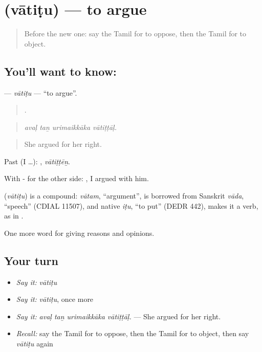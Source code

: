 \section[\texorpdfstring{\ta{வாதிடு} (vātiṭu)}{வாதிடு (vātiṭu)}]{ (vātiṭu) — to argue}

\label{lesson:TA-C348-vatitu}



\begin{quote}
Before the new one: say the Tamil for to oppose, then the Tamil for to object.
\end{quote}

\subsection*{You'll want to know: }
\textbf{} — \emph{vātiṭu} — \textquotedblleft{}to argue\textquotedblright{}.

\begin{quote}
   .
\end{quote}

\begin{quote}
\emph{avaḷ taṉ urimaikkāka vātiṭṭāḷ.}
\end{quote}

\begin{quote}
She argued for her right.
\end{quote}

Past (I …): , \emph{vātiṭṭēṉ}.

With - for the other side:  , I argued with him.

\begin{cousinweb}
\textbf{} (\emph{vātiṭu}) is a compound: \emph{vātam}, \textquotedblleft{}argument\textquotedblright{}, is borrowed from Sanskrit \emph{vāda}, \textquotedblleft{}speech\textquotedblright{} (CDIAL 11507), and native \emph{iṭu}, \textquotedblleft{}to put\textquotedblright{} (DEDR 442), makes it a verb, as in .
\end{cousinweb}

\begin{grammarlens}[title={What you've built}]
One more word for giving reasons and opinions.
\end{grammarlens}

\subsection*{Your turn}
\begin{itemize}
\raggedright
  \item \emph{Say it:} \emph{vātiṭu}
  \item \emph{Say it:} \emph{vātiṭu}, once more
  \item \emph{Say it:} \emph{avaḷ taṉ urimaikkāka vātiṭṭāḷ.} — She argued for her right.
  \item \emph{Recall:} say the Tamil for to oppose, then the Tamil for to object, then say \emph{vātiṭu} again
\end{itemize}

